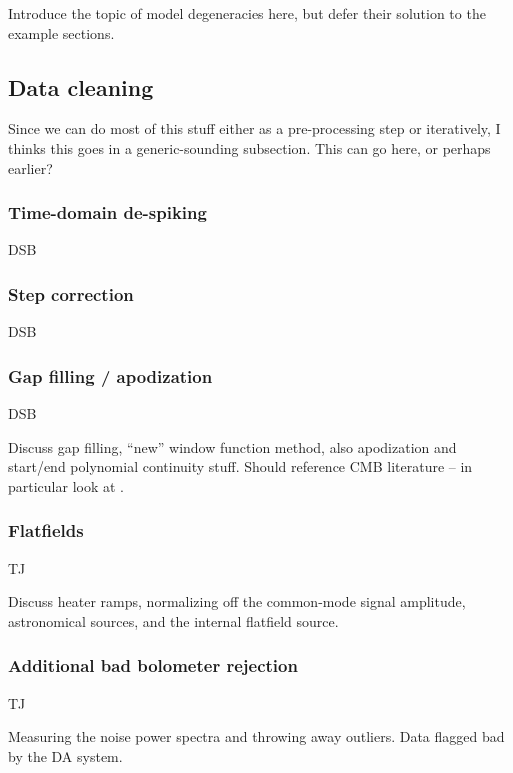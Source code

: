 \documentclass[useAMS,usenatbib,nofootinbib]{mn2e}
\begin{document}
Introduce the topic of model degeneracies here, but defer their
solution to the example sections.

\subsection{Data cleaning}

Since we can do most of this stuff either as a pre-processing step or
iteratively, I thinks this goes in a generic-sounding subsection. This
can go here, or perhaps earlier?

\subsubsection{Time-domain de-spiking}

DSB

\subsubsection{Step correction}

DSB

\subsubsection{Gap filling / apodization}

DSB

Discuss gap filling, ``new'' window function method, also apodization
and start/end polynomial continuity stuff. Should reference CMB
literature -- in particular look at \citet{stompor2002}.

\subsubsection{Flatfields}
\label{sec:flatfields}

TJ

Discuss heater ramps, normalizing off the common-mode signal
amplitude, astronomical sources, and the internal flatfield source.

\subsubsection{Additional bad bolometer rejection}

TJ

Measuring the noise power spectra and throwing away outliers. Data
flagged bad by the DA system.
\end{document}
